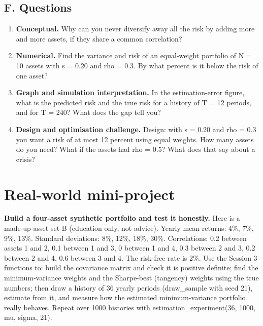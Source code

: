 \documentclass[11pt,a4paper]{article}
\begin{document}
\subsection*{F. Questions}
\begin{enumerate}[nosep]
\item \textbf{Conceptual.} Why can you never diversify away all the risk by adding more and more assets, if they share a common correlation?
\item \textbf{Numerical.} Find the variance and risk of an equal-weight portfolio of N = 10 assets with s = 0.20 and rho = 0.3. By what percent is it below the risk of one asset?
\item \textbf{Graph and simulation interpretation.} In the estimation-error figure, what is the predicted risk and the true risk for a history of T = 12 periods, and for T = 240? What does the gap tell you?
\item \textbf{Design and optimisation challenge.} Design: with s = 0.20 and rho = 0.3 you want a risk of at most 12 percent using equal weights. How many assets do you need? What if the assets had rho = 0.5? What does that say about a crisis?
\end{enumerate}

\section{Real-world mini-project}
\textbf{Build a four-asset synthetic portfolio and test it honestly.} Here is a made-up asset set B (education only, not advice). Yearly mean returns: 4\%, 7\%, 9\%, 13\%. Standard deviations: 8\%, 12\%, 18\%, 30\%. Correlations: 0.2 between assets 1 and 2, 0.1 between 1 and 3, 0 between 1 and 4, 0.3 between 2 and 3, 0.2 between 2 and 4, 0.6 between 3 and 4. The risk-free rate is 2\%. Use the Session 3 functions to: build the covariance matrix and check it is positive definite; find the minimum-variance weights and the Sharpe-best (tangency) weights using the true numbers; then draw a history of 36 yearly periods (draw\_sample with seed 21), estimate from it, and measure how the estimated minimum-variance portfolio really behaves. Repeat over 1000 histories with estimation\_experiment(36, 1000, mu, sigma, 21).
\end{document}
